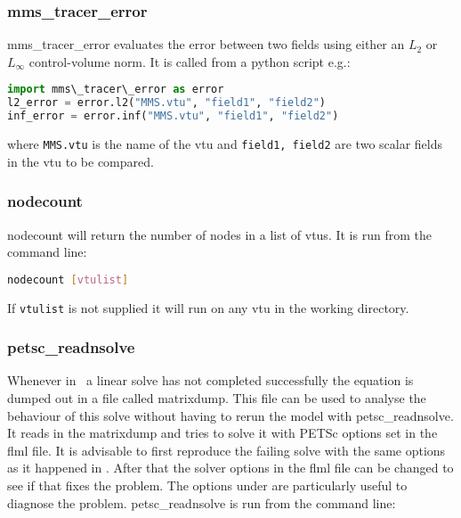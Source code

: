 
\subsubsection{mms\_tracer\_error}
\label{sect:mms_tracer_error}

mms\_tracer\_error evaluates the error between two fields using either an $L_2$ or $L_\infty$ control-volume norm. It is called from a python script e.g.:
\begin{lstlisting}[language = python]
import mms\_tracer\_error as error
l2_error = error.l2("MMS.vtu", "field1", "field2")
inf_error = error.inf("MMS.vtu", "field1", "field2")
\end{lstlisting}
where \lstinline[language = python]+MMS.vtu+ is the name of the vtu and \lstinline[language = python]+field1, field2+ are two scalar fields in the vtu to be compared.


\subsubsection{nodecount}
\label{sect:nodecount}
nodecount will return the number of nodes in a list of vtus. It is run from the command line:
\begin{lstlisting}[language = Bash]
nodecount [vtulist]
\end{lstlisting}
If \lstinline[language = Bash]+vtulist+ is not supplied it will run on any vtu in the working directory.


\subsubsection{petsc\_readnsolve}
\label{sect:petsc_readnsolve} 
Whenever in \fluidity\ a linear solve has not completed successfully the equation is dumped out in a file called matrixdump. This file can be used to analyse the behaviour of this solve without having to rerun the model with petsc\_readnsolve. It reads in the matrixdump and tries to solve it with PETSc options set in the flml file. It is advisable to first reproduce the failing solve with the same options as it happened in \fluidity. After that the solver options in the flml file can be changed to see if that fixes the problem. The options under  are particularly useful to diagnose the problem.  petsc\_readnsolve is run from the command line:

